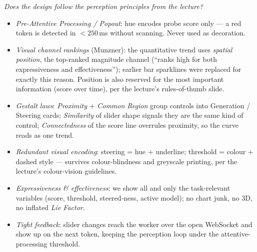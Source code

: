 \documentclass[11pt,a4paper]{article}
\newcommand{\q}[1]{\textit{#1}\\[-0.3em]}
\begin{document}
\q{Does the design follow the perception principles from the lecture?}
\begin{itemize}
  \setlength{\itemsep}{0pt}
  \item \emph{Pre-Attentive Processing / Popout}: hue encodes probe
  score only --- a red token is detected in ${<}250$\,ms without
  scanning. Never used as decoration.
  \item \emph{Visual channel rankings} (Munzner): the quantitative
  trend uses \emph{spatial position}, the top-ranked magnitude
  channel (``ranks high for both expressiveness and effectiveness'');
  earlier bar sparklines were replaced for exactly this reason.
  Position is also reserved for the most important information
  (score over time), per the lecture's rules-of-thumb slide.
  \item \emph{Gestalt laws}: \emph{Proximity} + \emph{Common Region}
  group controls into Generation / Steering cards; \emph{Similarity}
  of slider shape signals they are the same kind of control;
  \emph{Connectedness} of the score line overrules proximity, so the
  curve reads as one trend.
  \item \emph{Redundant visual encoding}: steering = hue + underline;
  threshold = colour + dashed style --- survives colour-blindness and
  greyscale printing, per the lecture's colour-vision guidelines.
  \item \emph{Expressiveness \& effectiveness}: we show all and only
  the task-relevant variables (score, threshold, steered-ness, active
  model); no chart junk, no 3D, no inflated \emph{Lie Factor}.
  \item \emph{Tight feedback}: slider changes reach the worker over
  the open WebSocket and show up on the next token, keeping the
  perception loop under the attentive-processing threshold.
\end{itemize}
\end{document}
